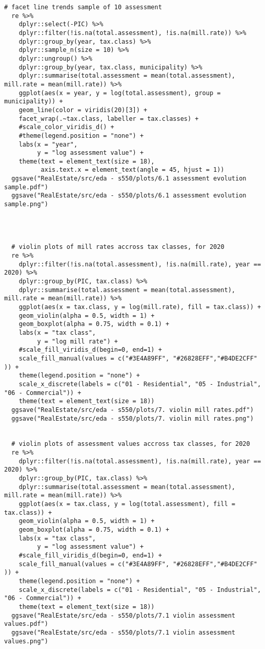 \documentclass{article}
\begin{document}
\begin{lstlisting}[style=R, caption={Code used for the exploratory data analysis.}, captionpos=b]
    # facet line trends sample of 10 assessment
  re %>% 
    dplyr::select(-PIC) %>% 
    dplyr::filter(!is.na(total.assessment), !is.na(mill.rate)) %>% 
    dplyr::group_by(year, tax.class) %>% 
    dplyr::sample_n(size = 10) %>% 
    dplyr::ungroup() %>% 
    dplyr::group_by(year, tax.class, municipality) %>% 
    dplyr::summarise(total.assessment = mean(total.assessment), mill.rate = mean(mill.rate)) %>% 
    ggplot(aes(x = year, y = log(total.assessment), group = municipality)) +
    geom_line(color = viridis(20)[3]) +
    facet_wrap(.~tax.class, labeller = tax.classes) + 
    #scale_color_viridis_d() +
    #theme(legend.position = "none") +
    labs(x = "year",
         y = "log assessment value") +
    theme(text = element_text(size = 18),
          axis.text.x = element_text(angle = 45, hjust = 1))
  ggsave("RealEstate/src/eda - s550/plots/6.1 assessment evolution sample.pdf")
  ggsave("RealEstate/src/eda - s550/plots/6.1 assessment evolution sample.png")
  
  
  
  
  # violin plots of mill rates accross tax classes, for 2020
  re %>%  
    dplyr::filter(!is.na(total.assessment), !is.na(mill.rate), year == 2020) %>% 
    dplyr::group_by(PIC, tax.class) %>% 
    dplyr::summarise(total.assessment = mean(total.assessment), mill.rate = mean(mill.rate)) %>% 
    ggplot(aes(x = tax.class, y = log(mill.rate), fill = tax.class)) +
    geom_violin(alpha = 0.5, width = 1) +
    geom_boxplot(alpha = 0.75, width = 0.1) +
    labs(x = "tax class",
         y = "log mill rate") +
    #scale_fill_viridis_d(begin=0, end=1) +
    scale_fill_manual(values = c("#3E4A89FF", "#26828EFF","#B4DE2CFF" )) +
    theme(legend.position = "none") +
    scale_x_discrete(labels = c("01 - Residential", "05 - Industrial", "06 - Commercial")) +
    theme(text = element_text(size = 18))
  ggsave("RealEstate/src/eda - s550/plots/7. violin mill rates.pdf")
  ggsave("RealEstate/src/eda - s550/plots/7. violin mill rates.png")
  
  
  # violin plots of assessment values accross tax classes, for 2020
  re %>%  
    dplyr::filter(!is.na(total.assessment), !is.na(mill.rate), year == 2020) %>% 
    dplyr::group_by(PIC, tax.class) %>% 
    dplyr::summarise(total.assessment = mean(total.assessment), mill.rate = mean(mill.rate)) %>% 
    ggplot(aes(x = tax.class, y = log(total.assessment), fill = tax.class)) +
    geom_violin(alpha = 0.5, width = 1) +
    geom_boxplot(alpha = 0.75, width = 0.1) +
    labs(x = "tax class",
         y = "log assessment value") +
    #scale_fill_viridis_d(begin=0, end=1) +
    scale_fill_manual(values = c("#3E4A89FF", "#26828EFF","#B4DE2CFF" )) +
    theme(legend.position = "none") +
    scale_x_discrete(labels = c("01 - Residential", "05 - Industrial", "06 - Commercial")) +
    theme(text = element_text(size = 18))
  ggsave("RealEstate/src/eda - s550/plots/7.1 violin assessment values.pdf")
  ggsave("RealEstate/src/eda - s550/plots/7.1 violin assessment values.png")
\end{lstlisting}
\end{document}
